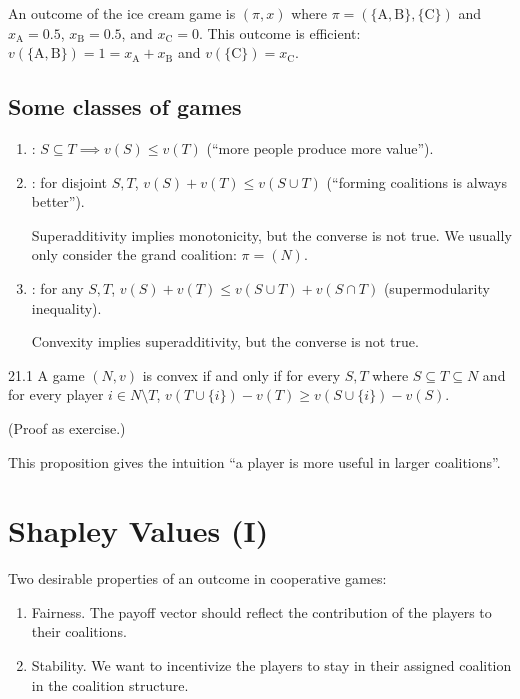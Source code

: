 \documentclass[12pt,letterpaper]{report}
\begin{document}
\begin{ex}
  An outcome of the ice cream game is $(\pi, x)$ where
  $\pi = (\{\text{A}, \text{B}\}, \{\text{C}\})$ and $x_\text{A} = 0.5$, $x_\text{B} = 0.5$, and
  $x_\text{C} = 0$.
  This outcome is efficient: $v(\{\text{A}, \text{B}\}) = 1 = x_\text{A} + x_\text{B}$ and
  $v(\{\text{C}\}) = x_\text{C}$.
\end{ex}

\pagebreak
\subsection{Some classes of games}

\begin{enumerate}
  \item
  : $S \subseteq T \implies v(S) \leq v(T)$ (``more people produce more
  value'').
  \item
  : for disjoint $S, T$, $v(S) + v(T) \leq v(S \cup T)$ (``forming
  coalitions is always better'').

  Superadditivity implies monotonicity, but the converse is not true.
  We usually only consider the grand coalition: $\pi = (N)$.
  \item
  : for any $S, T$, $v(S) + v(T) \leq v(S \cup T) + v(S \cap T)$
  (supermodularity inequality).

  Convexity implies superadditivity, but the converse is not true.
\end{enumerate}

\begin{prop}{}{21.1}
  A game $(N, v)$ is convex if and only if for every $S, T$ where $S \subseteq T \subseteq N$ and
  for every player $i \in N \setminus T$, $v(T \cup \{i\}) - v(T) \geq v(S \cup \{i\}) - v(S)$.
\end{prop}

(Proof as exercise.)

This proposition gives the intuition ``a player is more useful in larger coalitions''.

\section{Shapley Values (I)}

Two desirable properties of an outcome in cooperative games:
\begin{enumerate}
  \item
  Fairness.
  The payoff vector should reflect the contribution of the players to their coalitions.
  \item
  Stability.
  We want to incentivize the players to stay in their assigned coalition in the coalition structure.
\end{enumerate}
\end{document}
